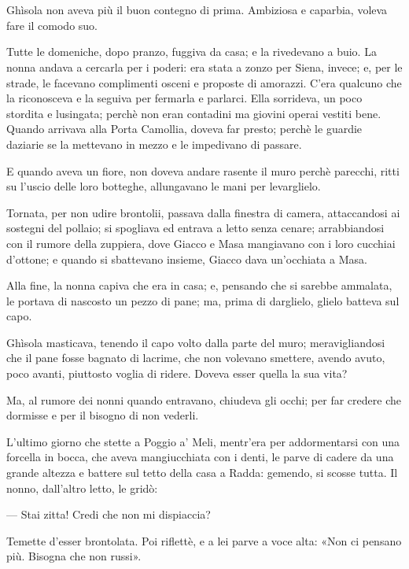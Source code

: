 \chapter{}

Ghìsola non aveva più il buon contegno di prima. Ambiziosa e caparbia, voleva fare il comodo suo.

Tutte le domeniche, dopo pranzo, fuggiva da casa; e la rivedevano a buio. La nonna andava a cercarla per i poderi: era stata a zonzo per Siena, invece; e, per le strade, le facevano complimenti osceni e proposte di amorazzi. C’era qualcuno che la riconosceva e la seguiva per fermarla e parlarci. Ella sorrideva, un poco stordita e lusingata; perchè non eran contadini ma giovini operai vestiti bene. Quando arrivava alla Porta Camollia, doveva far presto; perchè le guardie daziarie se la mettevano in mezzo e le impedivano di passare.

E quando aveva un fiore, non doveva andare rasente il muro perchè parecchi, ritti su l’uscio delle loro botteghe, allungavano le mani per levarglielo.

Tornata, per non udire brontolii, passava dalla finestra di camera, attaccandosi ai sostegni del pollaio; si spogliava ed entrava a letto senza cenare; arrabbiandosi con il rumore della zuppiera, dove Giacco e Masa mangiavano con i loro cucchiai d’ottone; e quando si sbattevano insieme, Giacco dava un’occhiata a Masa.

Alla fine, la nonna capiva che era in casa; e, pensando che si sarebbe ammalata, le portava di nascosto un pezzo di pane; ma, prima di darglielo, glielo batteva sul capo.

Ghìsola masticava, tenendo il capo volto dalla parte del muro; meravigliandosi che il pane fosse bagnato di lacrime, che non volevano smettere, avendo avuto, poco avanti, piuttosto voglia di ridere. Doveva esser quella la sua vita?

Ma, al rumore dei nonni quando entravano, chiudeva gli occhi; per far credere che dormisse e per il bisogno di non vederli.

L'ultimo giorno che stette a Poggio a' Meli, mentr'era per addormentarsi con una forcella in bocca, che aveva mangiucchiata con i denti, le parve di cadere da una grande altezza e battere sul tetto della casa a Radda: gemendo, si scosse tutta. Il nonno, dall'altro letto, le gridò:

— Stai zitta! Credi che non mi dispiaccia?

Temette d'esser brontolata. Poi riflettè, e a lei parve a voce alta: «Non ci pensano più. Bisogna che non russi».

